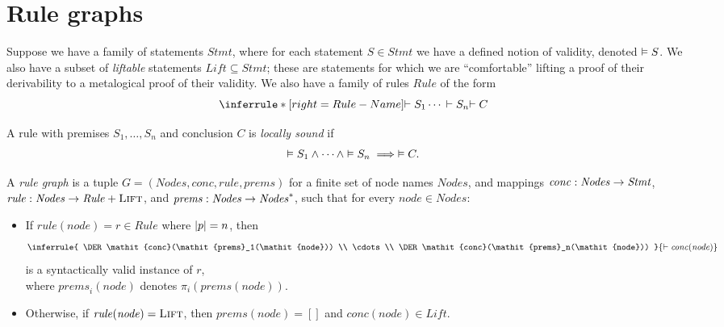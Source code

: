
\section{Rule graphs}

\newcommand*{\DomLiftable}{\mathit{Lift}}
\newcommand*{\DomStmt}{\mathit{Stmt}}
\newcommand*{\DomRule}{\mathit{Rule}}
\newcommand*{\LIFT}{\textsc{Lift}}

Suppose we have a family of statements $\DomStmt$,
where for each statement $S \in \DomStmt$
we have a defined notion of validity,
denoted $\vDash S$.
%
We also have a subset of \emph{liftable} statements
$\DomLiftable \subseteq \DomStmt$;
these are statements for which
we are ``comfortable'' lifting a proof of their derivability
to a metalogical proof of their validity.
%
We also have a family of rules $\DomRule$ of the form
\[
    \inferrule*[right=Rule-Name]{
        \DER S_1 \\ \cdots \\ \DER S_n
    }{
        \DER C
    }
\]
%
\begin{definition}
    A rule with premises $S_1,\dots,S_n$ and conclusion $C$ is \emph{locally sound} if
    \[\vDash S_1 \wedge \cdots \wedge \vDash S_n \implies \vDash C.\]
\end{definition}
%

\newcommand*{\DomNode}{\mathit{Nodes}}
\newcommand*{\node}{\mathit{node}}
\newcommand*{\MapConc}{\mathit{conc}}
\newcommand*{\MapRule}{\mathit{rule}}
\newcommand*{\MapPrems}{\mathit{prems}}

\begin{definition}
A \emph{rule graph} is a tuple $G=(\DomNode,\MapConc,\MapRule,\MapPrems)$ for a
finite set of node names $\DomNode$,
and mappings %
    $\MapConc : \DomNode \ra \DomStmt$,
    $\MapRule : \DomNode \ra \DomRule + \LIFT$,
 and   $\MapPrems : \DomNode \ra \DomNode^*$,
such that for every $\node \in \DomNode$:
\begin{itemize}
\item If $\MapRule(\node) = r \in \DomRule$
    where $\left|p\right| = n$, then
    \[
        \inferrule{
            \DER \MapConc(\MapPrems_1(\node))
            \\ \cdots \\
            \DER \MapConc(\MapPrems_n(\node))
        }{ \DER \MapConc(\node) }
    \]
    is a syntactically valid instance of $r$,\\
    where $\MapPrems_i(\node)$
    denotes $\pi_i(\MapPrems(\node))$.
\item Otherwise, if $\MapRule(\node) = \LIFT$,
    then $\MapPrems(\node) = []$ and 
    $\MapConc(\node) \in \DomLiftable$.
\end{itemize}
\end{definition}


